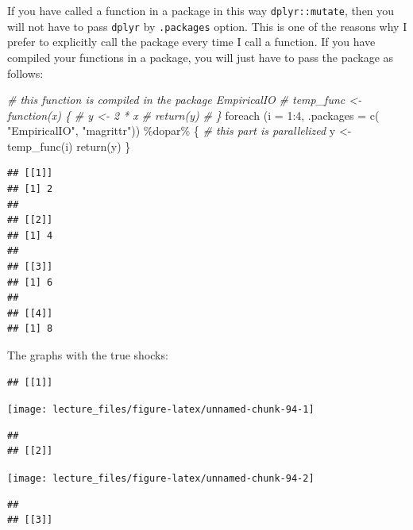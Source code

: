 \documentclass[
]{book}
\newenvironment{Shaded}{\begin{snugshade}}{\end{snugshade}}
\newcommand{\AttributeTok}[1]{\textcolor[rgb]{0.77,0.63,0.00}{#1}}
\newcommand{\CommentTok}[1]{\textcolor[rgb]{0.56,0.35,0.01}{\textit{#1}}}
\newcommand{\DecValTok}[1]{\textcolor[rgb]{0.00,0.00,0.81}{#1}}
\newcommand{\FunctionTok}[1]{\textcolor[rgb]{0.00,0.00,0.00}{#1}}
\newcommand{\NormalTok}[1]{#1}
\newcommand{\OtherTok}[1]{\textcolor[rgb]{0.56,0.35,0.01}{#1}}
\newcommand{\SpecialCharTok}[1]{\textcolor[rgb]{0.00,0.00,0.00}{#1}}
\newcommand{\StringTok}[1]{\textcolor[rgb]{0.31,0.60,0.02}{#1}}
\begin{document}
If you have called a function in a package in this way \texttt{dplyr::mutate}, then you will not have to pass \texttt{dplyr} by \texttt{.packages} option. This is one of the reasons why I prefer to explicitly call the package every time I call a function. If you have compiled your functions in a package, you will just have to pass the package as follows:

\begin{Shaded}
\begin{Highlighting}[]
\CommentTok{\# this function is compiled in the package EmpiricalIO}
\CommentTok{\# temp\_func \textless{}{-} function(x) \{}
\CommentTok{\#   y \textless{}{-} 2 * x}
\CommentTok{\#   return(y)}
\CommentTok{\# \}}
\FunctionTok{foreach}\NormalTok{ (}\AttributeTok{i =} \DecValTok{1}\SpecialCharTok{:}\DecValTok{4}\NormalTok{, }
         \AttributeTok{.packages =} \FunctionTok{c}\NormalTok{(}
           \StringTok{"EmpiricalIO"}\NormalTok{,}
           \StringTok{"magrittr"}\NormalTok{)) }\SpecialCharTok{\%dopar\%}\NormalTok{ \{}
  \CommentTok{\# this part is parallelized}
\NormalTok{  y }\OtherTok{\textless{}{-}} \FunctionTok{temp\_func}\NormalTok{(i)}
  \FunctionTok{return}\NormalTok{(y)}
\NormalTok{\}}
\end{Highlighting}
\end{Shaded}

\begin{verbatim}
## [[1]]
## [1] 2
## 
## [[2]]
## [1] 4
## 
## [[3]]
## [1] 6
## 
## [[4]]
## [1] 8
\end{verbatim}

The graphs with the true shocks:

\begin{verbatim}
## [[1]]
\end{verbatim}

\begin{center}\texttt{[image: lecture\_files/figure-latex/unnamed-chunk-94-1]} \end{center}

\begin{verbatim}
## 
## [[2]]
\end{verbatim}

\begin{center}\texttt{[image: lecture\_files/figure-latex/unnamed-chunk-94-2]} \end{center}

\begin{verbatim}
## 
## [[3]]
\end{verbatim}
\end{document}
